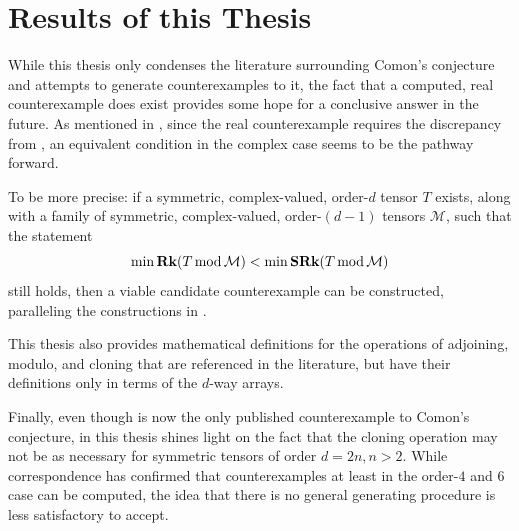 \documentclass[../Lael_John_MasterThesis_Draft.tex]{subfiles}
\begin{document}
\section{Results of this Thesis}
While this thesis only condenses the literature surrounding Comon's conjecture and attempts to generate counterexamples to it, the fact that a computed, real counterexample does exist provides some hope for a conclusive answer in the future. As mentioned in , since the real counterexample requires the discrepancy from , an equivalent condition in the complex case seems to be the pathway forward.

To be more precise: if a symmetric, complex-valued, order-$d$ tensor $T$ exists, along with a family of symmetric, complex-valued, order-$(d-1)$ tensors $\mathcal{M}$, such that the statement $$\min \textbf{Rk}(T \text{\,mod\,} \mathcal{M}) < \min \textbf{SRk}(T \text{\,mod\,} \mathcal{M})$$ still holds, then a viable candidate counterexample can be constructed, paralleling the constructions in \cites{shitov_comons_2020, wang_lower_2023}. 

This thesis also provides mathematical definitions for the operations of adjoining, modulo, and cloning that are referenced in the literature, but have their definitions only in terms of the $d$-way arrays. 

Finally, even though \cite{wang_lower_2023} is now the only published counterexample to Comon's conjecture,  in this thesis shines light on the fact that the cloning operation may not be as necessary for symmetric tensors of order $d = 2n, n > 2$. While correspondence has confirmed that counterexamples at least in the order-$4$ and $6$ case can be computed, the idea that there is no general generating procedure is less satisfactory to accept. 
\end{document}
